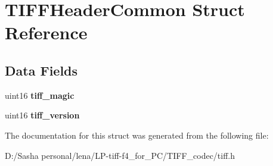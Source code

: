 \hypertarget{struct_t_i_f_f_header_common}{}\section{T\+I\+F\+F\+Header\+Common Struct Reference}
\label{struct_t_i_f_f_header_common}
\subsection*{Data Fields}
\begin{DoxyCompactItemize}
\item 
\hypertarget{struct_t_i_f_f_header_common_ac73e530bcf1587e88771c5806cfa6504}{}uint16 {\bfseries tiff\+\_\+magic}\label{struct_t_i_f_f_header_common_ac73e530bcf1587e88771c5806cfa6504}

\item 
\hypertarget{struct_t_i_f_f_header_common_a86111434332ba79982db1a0e14d592e5}{}uint16 {\bfseries tiff\+\_\+version}\label{struct_t_i_f_f_header_common_a86111434332ba79982db1a0e14d592e5}

\end{DoxyCompactItemize}


The documentation for this struct was generated from the following file\+:\begin{DoxyCompactItemize}
\item 
D\+:/\+Sasha personal/lena/\+L\+P-\/tiff-\/f4\+\_\+for\+\_\+\+P\+C/\+T\+I\+F\+F\+\_\+codec/tiff.\+h\end{DoxyCompactItemize}
